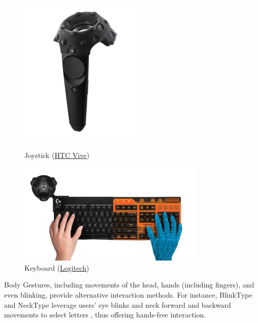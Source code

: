 \begin{figure}[h!]
 
  \begin{minipage}{0.48\textwidth}
    \centering
    \includegraphics[width=0.3\linewidth]{Background/kisspng-htc-vive-playstation-vr-head-mounted-display-oculu-vive-controller-accessories-5b45845dcff760.0171668615312825258518-removebg-preview.png} %
    \caption{Joystick (\href{https://www.vive.com/eu/accessory/controller/}{HTC Vive})}
  \end{minipage}\hfill
  \begin{minipage}{0.48\textwidth}
    \centering
    \includegraphics[width=0.48\linewidth]{Background/head-removebg-preview.png} %
            \captionsetup{justification=centering}

    \caption{Keyboard (\href{https://www.theverge.com/2017/11/3/16602674/logitech-bridge-sdk-htc-vive-tracker-keyboard}{Logitech})}
  \end{minipage}
\end{figure}
\noindent
Body Gestures, including movements of the head, hands (including fingers), and even blinking, provide alternative interaction methods. For instance, BlinkType and NeckType leverage users’ eye blinks and neck forward and backward movements to select letters , thus offering hands-free interaction\cite{Leng2022}. 

